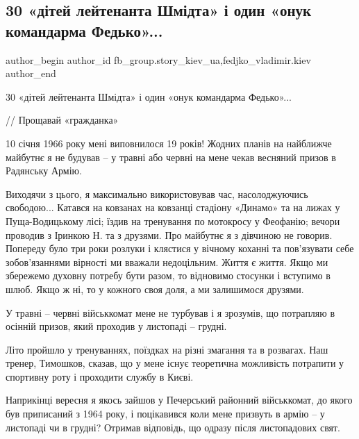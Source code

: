  
 
 
 
 
 
\subsection{30 «дітей лейтенанта Шмідта» і один «онук командарма Федько»...}
\label{sec:27_12_2021.fb.fb_group.story_kiev_ua.3.onuk_komandarma}
 
\ifcmt
 author_begin
   author_id fb_group.story_kiev_ua,fedjko_vladimir.kiev
 author_end
\fi

30 «дітей лейтенанта Шмідта» і один «онук командарма Федько»...

// Прощавай «гражданка»

10 січня 1966 року мені виповнилося 19 років! Жодних планів на найближче
майбутнє я не будував – у травні або червні на мене чекав весняний призов в
Радянську Армію.

Виходячи з цього, я максимально використовував час, насолоджуючись свободою...
Катався на ковзанах на ковзанці стадіону «Динамо» та на лижах у Пуща-Водицькому
лісі; їздив на тренування по мотокросу у Феофанію; вечори проводив з Іринкою Н.
та з друзями. Про майбутнє я з дівчиною не говорив. Попереду було три роки
розлуки і клястися у вічному коханні та пов’язувати себе зобов’язаннями
вірності ми вважали недоцільним. Життя є життя. Якщо ми збережемо духовну
потребу бути разом, то відновимо стосунки і вступимо в шлюб. Якщо ж ні, то у
кожного своя доля, а ми залишимося друзями. 

У травні – червні військкомат мене не турбував і я зрозумів, що потрапляю в
осінній призов, який проходив у листопаді – грудні.

Літо пройшло у тренуваннях, поїздках на різні змагання та в розвагах. Наш
тренер, Тимошков, сказав, що у мене існує теоретична можливість потрапити у
спортивну роту і проходити службу в Києві. 

Наприкінці вересня я якось зайшов у Печерський районний військкомат, до якого
був приписаний з 1964 року, і поцікавився коли мене призвуть в армію – у
листопаді чи в грудні? Отримав відповідь, що одразу після листопадових свят.


